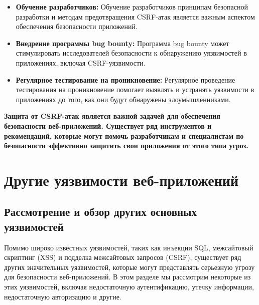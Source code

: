 \documentclass[a4paper,12pt]{diplom}
\begin{document}
	 \begin{itemize}
	 \item \textbf{Обучение разработчиков:}  Обучение разработчиков принципам безопасной разработки и методам предотвращения CSRF-атак является важным аспектом обеспечения безопасности приложений.
	 \item \textbf{Внедрение программы bug bounty:}  Программа bug bounty может стимулировать исследователей безопасности к обнаружению уязвимостей в приложениях, включая CSRF-уязвимости. 
	 \item \textbf{Регулярное тестирование на проникновение:}  Регулярное проведение тестирования на проникновение помогает выявлять и устранять уязвимости в приложениях до того, как они будут обнаружены злоумышленниками.
	\end{itemize}
	 
	 \textbf{Защита от CSRF-атак является важной задачей для обеспечения безопасности веб-приложений. Существует ряд инструментов и рекомендаций, которые могут помочь разработчикам и специалистам по безопасности эффективно защитить свои приложения от этого типа угроз.}
	 
	 
	 
	 
	 
	 
	 
	 
	 
	 
	 
	 
	 
	 
	 
	 
	 
	 
	 
	 
	 
	 
	 
	 
	 
	 
	 
	 
	 
	 
	 \chapter[Другие уязвимости веб-приложений]{Другие уязвимости веб-приложений}
	 
	 
	 
	 
	 \section{Рассмотрение и обзор других основных уязвимостей}
	 
	 Помимо широко известных уязвимостей, таких как инъекции SQL, межсайтовый скриптинг (XSS) и подделка межсайтовых запросов (CSRF), существует ряд других значительных уязвимостей, которые могут представлять серьезную угрозу для безопасности веб-приложений. В этом разделе мы рассмотрим некоторые из этих уязвимостей, включая недостаточную аутентификацию, утечку информации, недостаточную авторизацию и другие.
	 
\end{document}
